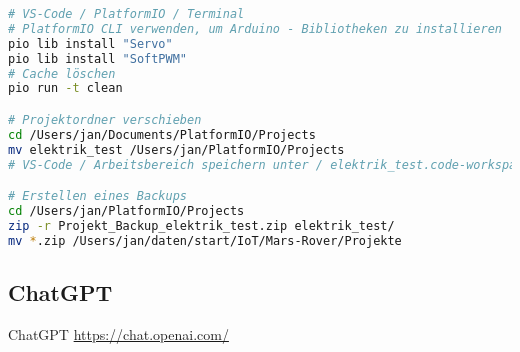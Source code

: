 \documentclass{vorlage-design-main}
\begin{document}
\begin{lstlisting}[language=bash]
# VS-Code / PlatformIO / Terminal
# PlatformIO CLI verwenden, um Arduino - Bibliotheken zu installieren
pio lib install "Servo"
pio lib install "SoftPWM"
# Cache löschen
pio run -t clean

# Projektordner verschieben
cd /Users/jan/Documents/PlatformIO/Projects
mv elektrik_test /Users/jan/PlatformIO/Projects
# VS-Code / Arbeitsbereich speichern unter / elektrik_test.code-workspace + Alias erstellen

# Erstellen eines Backups
cd /Users/jan/PlatformIO/Projects
zip -r Projekt_Backup_elektrik_test.zip elektrik_test/
mv *.zip /Users/jan/daten/start/IoT/Mars-Rover/Projekte
\end{lstlisting}

\hypertarget{chatgpt}{%
\subsection{ChatGPT}\label{chatgpt}}

ChatGPT \url{https://chat.openai.com/}
\end{document}
